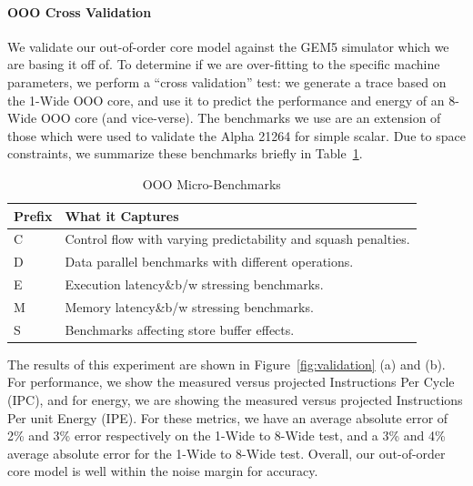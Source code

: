 \paragraph{OOO Cross Validation}
We validate our out-of-order core model against the GEM5 simulator which we are basing
it off of.  To determine if we are over-fitting to the specific machine
parameters, we perform a ``cross validation'' test:  we generate a trace based on the
1-Wide OOO core, and use it to predict the performance and energy of an 8-Wide OOO 
core (and vice-verse).  The benchmarks we use are an extension of those which were
used to validate the Alpha 21264 for simple scalar\cite{simalpha}. Due to space 
constraints, we summarize these benchmarks briefly in Table~\ref{tab:micro-benchmarks}.
\fi

\begin{table}
\begin{center}
\footnotesize
\def\arraystretch{0.9}
\setlength{\tabcolsep}{.21em}

    \begin{tabular}{l>{\RaggedRight}p{3.8in}}  \toprule
    \textbf{Prefix} & \textbf{What it Captures} \\ \midrule
    C & Control flow with varying predictability and squash penalties. \\
    D & Data parallel benchmarks with different operations.\\
    E & Execution latency\&b/w stressing benchmarks.\\
    M & Memory latency\&b/w stressing benchmarks.\\
    S & Benchmarks affecting store buffer effects.\\
    
\bottomrule
  \end{tabular}
\end{center}
\vspace{-0.22in}
  \caption{OOO Micro-Benchmarks}
  \label{tab:micro-benchmarks}
\vspace{-0.1in}
\end{table}
\fi

The results of this experiment are shown in 
Figure~\ref{fig:validation} (a) and (b).  For performance, we show
the measured versus projected Instructions Per Cycle (IPC), and for energy,
we are showing the measured versus projected Instructions Per unit Energy (IPE).  For
these metrics, we have an average absolute error of 2\% and 3\% error respectively 
on the 1-Wide to 8-Wide test, and a 3\% and 4\% average absolute error for the 1-Wide to
8-Wide test.  Overall, our out-of-order core model is well within the noise 
margin for accuracy.

